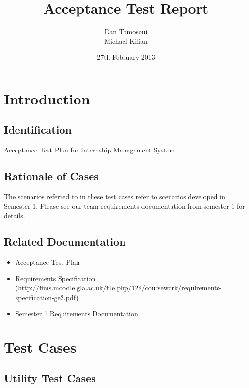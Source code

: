 \documentclass{l3deliverable}
\title{Acceptance Test Report}
\author{
  Dan Tomosoui\\
  Michael Kilian \\
}
\date{27th February 2013}
\begin{document}

\maketitle

\tableofcontents

\newpage


\section{Introduction}

\subsection{Identification}
Acceptance Test Plan for Internship Management System.

\subsection{Rationale of Cases}
The scenarios referred to in these test cases refer to scenarios developed in Semester 1. Please see our team requirements documentation from semester 1 for details.

\subsection{Related Documentation}
\begin{itemize}
\item{Acceptance Test Plan}
\item{Requirements Specification (\url{http://fims.moodle.gla.ac.uk/file.php/128/coursework/requirements-specification-ge2.pdf})}
\item{Semester 1 Requirements Documentation}
\end{itemize}

\newpage
\section{Test Cases}

\subsection{Utility Test Cases}
\end{document}
